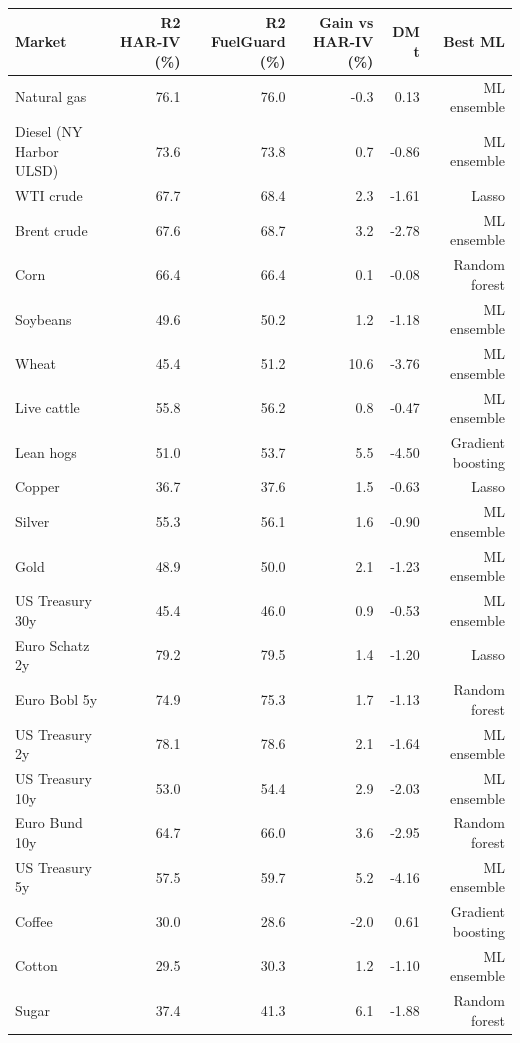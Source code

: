 \begin{tabular}{lrrrrr}
\toprule
Market & R2 HAR-IV (\%) & R2 FuelGuard (\%) & Gain vs HAR-IV (\%) & DM t & Best ML \\
\midrule
Natural gas & 76.1 & 76.0 & -0.3 & 0.13 & ML ensemble \\
Diesel (NY Harbor ULSD) & 73.6 & 73.8 & 0.7 & -0.86 & ML ensemble \\
WTI crude & 67.7 & 68.4 & 2.3 & -1.61 & Lasso \\
Brent crude & 67.6 & 68.7 & 3.2 & -2.78 & ML ensemble \\
Corn & 66.4 & 66.4 & 0.1 & -0.08 & Random forest \\
Soybeans & 49.6 & 50.2 & 1.2 & -1.18 & ML ensemble \\
Wheat & 45.4 & 51.2 & 10.6 & -3.76 & ML ensemble \\
Live cattle & 55.8 & 56.2 & 0.8 & -0.47 & ML ensemble \\
Lean hogs & 51.0 & 53.7 & 5.5 & -4.50 & Gradient boosting \\
Copper & 36.7 & 37.6 & 1.5 & -0.63 & Lasso \\
Silver & 55.3 & 56.1 & 1.6 & -0.90 & ML ensemble \\
Gold & 48.9 & 50.0 & 2.1 & -1.23 & ML ensemble \\
US Treasury 30y & 45.4 & 46.0 & 0.9 & -0.53 & ML ensemble \\
Euro Schatz 2y & 79.2 & 79.5 & 1.4 & -1.20 & Lasso \\
Euro Bobl 5y & 74.9 & 75.3 & 1.7 & -1.13 & Random forest \\
US Treasury 2y & 78.1 & 78.6 & 2.1 & -1.64 & ML ensemble \\
US Treasury 10y & 53.0 & 54.4 & 2.9 & -2.03 & ML ensemble \\
Euro Bund 10y & 64.7 & 66.0 & 3.6 & -2.95 & Random forest \\
US Treasury 5y & 57.5 & 59.7 & 5.2 & -4.16 & ML ensemble \\
Coffee & 30.0 & 28.6 & -2.0 & 0.61 & Gradient boosting \\
Cotton & 29.5 & 30.3 & 1.2 & -1.10 & ML ensemble \\
Sugar & 37.4 & 41.3 & 6.1 & -1.88 & Random forest \\
\bottomrule
\end{tabular}

